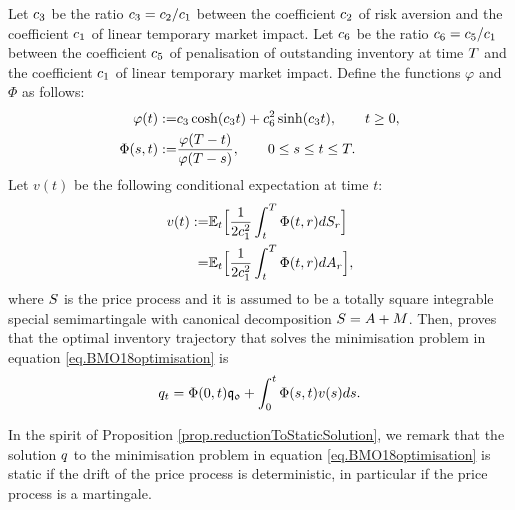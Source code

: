 \documentclass[10pt,a4paper]{article}
\begin{document}
	Let $c_{3}$ be the ratio $c_{3}=c_{2}/c_{1}$ between the coefficient $c_{2}$ of risk aversion and the coefficient $c_{1}$ of linear temporary market impact. Let $c_{6}$ be the ratio $c_{6}=c_{5}/c_{1}$ between the coefficient $c_{5}$ of penalisation of outstanding inventory at time $T$  and the coefficient $c_{1}$ of linear temporary market impact. Define the functions $\varphi$ and $\Phi$ as follows:
	\begin{equation}\label{eq.timeFunctionsInBMO18solution}
	\begin{split}
	\varphi(t) :=& c_{3} \cosh (c_{3} t) + c_{6}^{2}  \sinh(c_{3} t), \qquad t\geq 0, \\
	\Phi(s,t) : = & \frac{\varphi(T - t)}{\varphi(T - s)} , \qquad 0\leq s \leq t \leq T.
	\end{split}
	\end{equation}
	Let $v(t)$ be the following conditional expectation at time $t$:
	\begin{equation}
	\label{eq.conditionalExpectationInBMO18solution}
	\begin{split}
	v(t) :=& \mathbb{{E}}_t \Big[\frac{1}{2c_{1}^{2}}\int_{t}^{T} \Phi(t,r)dS_r \Big] \\
	= & \mathbb{{E}}_t \Big[\frac{1}{2c_{1}^{2}}\int_{t}^{T} \Phi(t,r)dA_r \Big],
	\end{split}
	\end{equation}
	where $S$ is the price process and it is assumed to be a totally square integrable special semimartingale with canonical decomposition $S = A + M$. 
	Then, \cite[Theorem 3.1]{BMO18opt} proves that the optimal inventory trajectory that solves the minimisation problem in equation \eqref{eq.BMO18optimisation} is 
	\begin{equation}
	\label{eq.BMO18solution}
	q_t = \Phi(0,t)\mathfrak{q_0} + \int_{0}^{t} \Phi(s,t)v(s) ds.
	\end{equation}
	
	\begin{remark}
		In the spirit of Proposition \ref{prop.reductionToStaticSolution}, we remark that the solution $q$ to the minimisation problem in equation \eqref{eq.BMO18optimisation} is static if the drift of the price process is deterministic, in particular if the price process is a martingale. 
	\end{remark}
	
\end{document}
